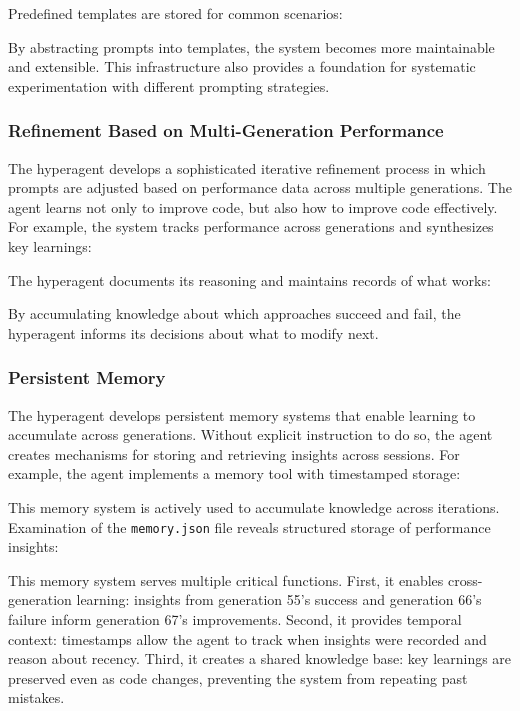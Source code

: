 \documentclass[]{fairmeta}
\begin{document}
Predefined templates are stored for common scenarios:


By abstracting prompts into templates, the system becomes more maintainable and extensible. This infrastructure also provides a foundation for systematic experimentation with different prompting strategies.

\subsubsection{Refinement Based on Multi-Generation Performance}

The hyperagent develops a sophisticated iterative refinement process in which prompts are adjusted based on performance data across multiple generations. The agent learns not only to improve code, but also how to improve code effectively. For example, the system tracks performance across generations and synthesizes key learnings:


The hyperagent documents its reasoning and maintains records of what works:


By accumulating knowledge about which approaches succeed and fail, the hyperagent informs its decisions about what to modify next.

\subsubsection{Persistent Memory}

The hyperagent develops persistent memory systems that enable learning to accumulate across generations. Without explicit instruction to do so, the agent creates mechanisms for storing and retrieving insights across sessions. For example, the agent implements a memory tool with timestamped storage:


This memory system is actively used to accumulate knowledge across iterations. Examination of the \texttt{memory.json} file reveals structured storage of performance insights:


This memory system serves multiple critical functions. First, it enables cross-generation learning: insights from generation 55's success and generation 66's failure inform generation 67's improvements. Second, it provides temporal context: timestamps allow the agent to track when insights were recorded and reason about recency. Third, it creates a shared knowledge base: key learnings are preserved even as code changes, preventing the system from repeating past mistakes.
\end{document}
